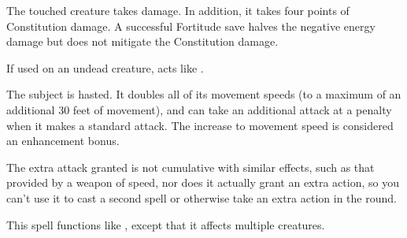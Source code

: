 \begin{comment}
\subsubsection{H}
\end{comment}

\spellrng{\rngtouch}
\begin{spelleffect}
  The touched creature takes damage. In addition, it takes four points of Constitution damage. A successful Fortitude save halves the negative energy damage but does not mitigate the Constitution damage.
\end{spelleffect}
\begin{spellnotes}
  If used on an undead creature,  acts like .
\end{spellnotes}

\spelldur{\durshort}
\begin{spelleffect}
  The subject is hasted. It doubles all of its movement speeds (to a maximum of an additional 30 feet of movement), and can take an additional attack at a  penalty when it makes a standard attack. The increase to movement speed is considered an enhancement bonus.
\end{spelleffect}
\begin{spellnotes}
    The extra attack granted is not cumulative with similar effects, such as that provided by a weapon of speed, nor does it actually grant an extra action, so you can't use it to cast a second spell or otherwise take an extra action in the round.
\end{spellnotes}

\begin{spelleffect}
  This spell functions like , except that it affects multiple creatures.
\end{spelleffect}

